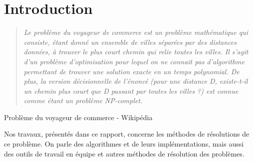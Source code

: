\chapter*{Introduction}

\begin{quotation}
\textit{Le problème du voyageur de commerce est un problème mathématique qui consiste, étant donné un ensemble de villes séparées par des distances données, à trouver le plus court chemin qui relie toutes les villes. Il s'agit d'un problème d'optimisation pour lequel on ne connait pas d'algorithme permettant de trouver une solution exacte en un temps polynomial. De plus, la version décisionnelle de l'énoncé (pour une distance D, existe-t-il un chemin plus court que D passant par toutes les villes ?) est connue comme étant un problème NP-complet.}
\end{quotation}
\begin{flushright}
Problème du voyageur de commerce - Wikipédia
\end{flushright}

\par
Nos travaux, présentés dans ce rapport, concerne les méthodes de résolutions de ce problème. On parle des algorithmes et de leurs implémentations, mais aussi des outils de travail en équipe et autres méthodes de résolution des problèmes.